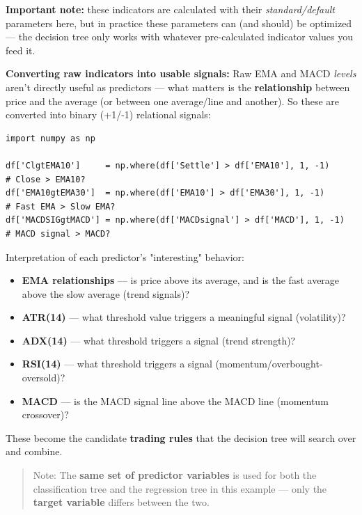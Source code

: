 \documentclass[12pt,openany]{book}
\begin{document}
\textbf{Important note:} these indicators are calculated with their \textit{standard/default} parameters here, but in practice these parameters can (and should) be optimized --- the decision tree only works with whatever pre-calculated indicator values you feed it.

\textbf{Converting raw indicators into usable signals:} Raw EMA and MACD \textit{levels} aren't directly useful as predictors --- what matters is the \textbf{relationship} between price and the average (or between one average/line and another). So these are converted into binary (+1/-1) relational signals:

\begin{Verbatim}[breaklines=true,fontsize=\small]
import numpy as np

df['ClgtEMA10']     = np.where(df['Settle'] > df['EMA10'], 1, -1)      # Close > EMA10?
df['EMA10gtEMA30']  = np.where(df['EMA10'] > df['EMA30'], 1, -1)       # Fast EMA > Slow EMA?
df['MACDSIGgtMACD'] = np.where(df['MACDsignal'] > df['MACD'], 1, -1)   # MACD signal > MACD?
\end{Verbatim}


Interpretation of each predictor's "interesting" behavior:

\begin{itemize}[leftmargin=*]
    \item \textbf{EMA relationships} --- is price above its average, and is the fast average above the slow average (trend signals)?
    \item \textbf{ATR(14)} --- what threshold value triggers a meaningful signal (volatility)?
    \item \textbf{ADX(14)} --- what threshold triggers a signal (trend strength)?
    \item \textbf{RSI(14)} --- what threshold triggers a signal (momentum/overbought-oversold)?
    \item \textbf{MACD} --- is the MACD signal line above the MACD line (momentum crossover)?

\end{itemize}

These become the candidate \textbf{trading rules} that the decision tree will search over and combine.

\begin{quote}
Note: The \textbf{same set of predictor variables} is used for both the classification tree and the regression tree in this example --- only the \textbf{target variable} differs between the two.
\end{quote}
\end{document}
